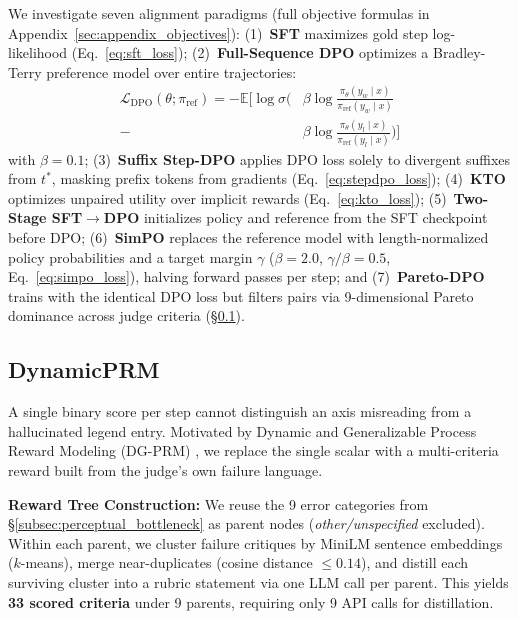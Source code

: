 \documentclass[11pt]{article}
\begin{document}
We investigate seven alignment paradigms (full objective formulas in Appendix~\ref{sec:appendix_objectives}): (1)~\textbf{SFT} maximizes gold step log-likelihood (Eq.~\ref{eq:sft_loss}); (2)~\textbf{Full-Sequence DPO} \citep{rafailov2023dpo} optimizes a Bradley-Terry preference model over entire trajectories:
\begin{align}
    \mathcal{L}_{\text{DPO}}(\theta; \pi_{\text{ref}}) = -\mathbb{E} \Big[ \log \sigma \Big( & \beta \log \frac{\pi_\theta(y_w \mid x)}{\pi_{\text{ref}}(y_w \mid x)} \nonumber \\
    {} - & \beta \log \frac{\pi_\theta(y_l \mid x)}{\pi_{\text{ref}}(y_l \mid x)} \Big) \Big]
    \label{eq:dpo_loss}
\end{align}
with $\beta = 0.1$; (3)~\textbf{Suffix Step-DPO} \citep{lai2024stepdpo} applies DPO loss solely to divergent suffixes from $t^*$, masking prefix tokens from gradients (Eq.~\ref{eq:stepdpo_loss}); (4)~\textbf{KTO} \citep{ethayarajh2024kto} optimizes unpaired utility over implicit rewards (Eq.~\ref{eq:kto_loss}); (5)~\textbf{Two-Stage SFT$\rightarrow$DPO} initializes policy and reference from the SFT checkpoint before DPO; (6)~\textbf{SimPO} \citep{meng2024simpo} replaces the reference model with length-normalized policy probabilities and a target margin $\gamma$ ($\beta = 2.0$, $\gamma/\beta = 0.5$, Eq.~\ref{eq:simpo_loss}), halving forward passes per step; and (7)~\textbf{Pareto-DPO} trains with the identical DPO loss but filters pairs via 9-dimensional Pareto dominance across judge criteria (\S\ref{subsec:dynamic_prm}).

\subsection{DynamicPRM}
\label{subsec:dynamic_prm}

A single binary score per step cannot distinguish an axis misreading from a hallucinated legend entry. Motivated by Dynamic and Generalizable Process Reward Modeling (DG-PRM) \citep{yin2024dgprm}, we replace the single scalar with a multi-criteria reward built from the judge's own failure language.

\textbf{Reward Tree Construction:} We reuse the 9 error categories from \S\ref{subsec:perceptual_bottleneck} as parent nodes (\textit{other/unspecified} excluded). Within each parent, we cluster failure critiques by MiniLM sentence embeddings ($k$-means), merge near-duplicates (cosine distance $\le 0.14$), and distill each surviving cluster into a rubric statement via one LLM call per parent. This yields \textbf{33 scored criteria} under 9 parents, requiring only 9 API calls for distillation.
\end{document}
